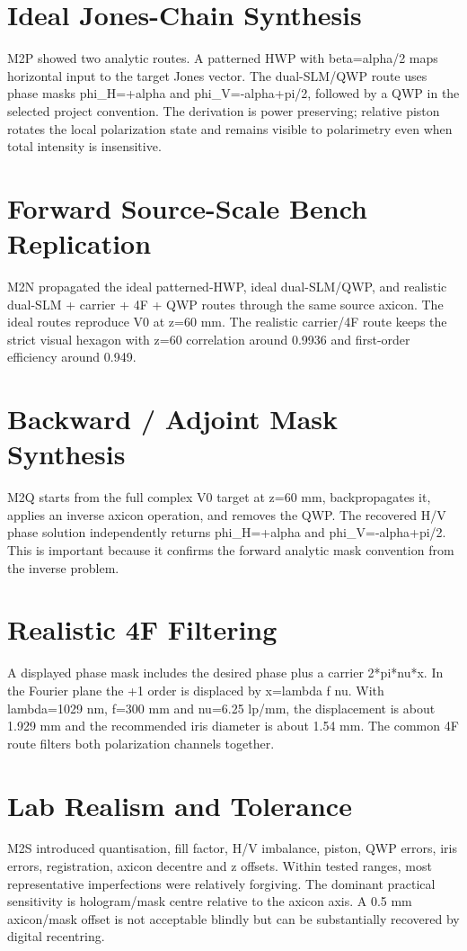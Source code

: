 \documentclass[11pt]{article}
\begin{document}
\section{Ideal Jones-Chain Synthesis}
M2P showed two analytic routes. A patterned HWP with beta=alpha/2 maps horizontal input to the target Jones vector. The dual-SLM/QWP route uses phase masks phi\_H=+alpha and phi\_V=-alpha+pi/2, followed by a QWP in the selected project convention. The derivation is power preserving; relative piston rotates the local polarization state and remains visible to polarimetry even when total intensity is insensitive.

\section{Forward Source-Scale Bench Replication}
M2N propagated the ideal patterned-HWP, ideal dual-SLM/QWP, and realistic dual-SLM + carrier + 4F + QWP routes through the same source axicon. The ideal routes reproduce V0 at z=60 mm. The realistic carrier/4F route keeps the strict visual hexagon with z=60 correlation around 0.9936 and first-order efficiency around 0.949.

\section{Backward / Adjoint Mask Synthesis}
M2Q starts from the full complex V0 target at z=60 mm, backpropagates it, applies an inverse axicon operation, and removes the QWP. The recovered H/V phase solution independently returns phi\_H=+alpha and phi\_V=-alpha+pi/2. This is important because it confirms the forward analytic mask convention from the inverse problem.

\section{Realistic 4F Filtering}
A displayed phase mask includes the desired phase plus a carrier 2*pi*nu*x. In the Fourier plane the +1 order is displaced by x=lambda f nu. With lambda=1029 nm, f=300 mm and nu=6.25 lp/mm, the displacement is about 1.929 mm and the recommended iris diameter is about 1.54 mm. The common 4F route filters both polarization channels together.

\section{Lab Realism and Tolerance}
M2S introduced quantisation, fill factor, H/V imbalance, piston, QWP errors, iris errors, registration, axicon decentre and z offsets. Within tested ranges, most representative imperfections were relatively forgiving. The dominant practical sensitivity is hologram/mask centre relative to the axicon axis. A 0.5 mm axicon/mask offset is not acceptable blindly but can be substantially recovered by digital recentring.
\end{document}
